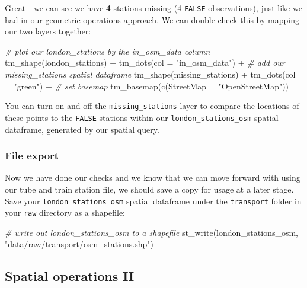 \documentclass[
]{book}
\newenvironment{Shaded}{\begin{snugshade}}{\end{snugshade}}
\newcommand{\AttributeTok}[1]{\textcolor[rgb]{0.77,0.63,0.00}{#1}}
\newcommand{\CommentTok}[1]{\textcolor[rgb]{0.56,0.35,0.01}{\textit{#1}}}
\newcommand{\FunctionTok}[1]{\textcolor[rgb]{0.00,0.00,0.00}{#1}}
\newcommand{\NormalTok}[1]{#1}
\newcommand{\SpecialCharTok}[1]{\textcolor[rgb]{0.00,0.00,0.00}{#1}}
\newcommand{\StringTok}[1]{\textcolor[rgb]{0.31,0.60,0.02}{#1}}
\begin{document}
Great - we can see we have \textbf{4} stations missing (4 \texttt{FALSE} observations), just like we had in our geometric operations approach. We can double-check this by mapping our two layers together:

\begin{Shaded}
\begin{Highlighting}[]
\CommentTok{\# plot our london\_stations by the in\_osm\_data column}
\FunctionTok{tm\_shape}\NormalTok{(london\_stations) }\SpecialCharTok{+} \FunctionTok{tm\_dots}\NormalTok{(}\AttributeTok{col =} \StringTok{"in\_osm\_data"}\NormalTok{) }\SpecialCharTok{+}
  \CommentTok{\# add our missing\_stations spatial dataframe}
  \FunctionTok{tm\_shape}\NormalTok{(missing\_stations) }\SpecialCharTok{+} \FunctionTok{tm\_dots}\NormalTok{(}\AttributeTok{col =} \StringTok{"green"}\NormalTok{) }\SpecialCharTok{+}
  \CommentTok{\# set basemap}
  \FunctionTok{tm\_basemap}\NormalTok{(}\FunctionTok{c}\NormalTok{(}\AttributeTok{StreetMap =} \StringTok{"OpenStreetMap"}\NormalTok{))}
\end{Highlighting}
\end{Shaded}

You can turn on and off the \texttt{missing\_stations} layer to compare the locations of these points to the \texttt{FALSE} stations within our \texttt{london\_stations\_osm} spatial dataframe, generated by our spatial query.

\hypertarget{file-export}{%
\subsubsection{File export}\label{file-export}}

Now we have done our checks and we know that we can move forward with using our tube and train station file, we should save a copy for usage at a later stage. Save your \texttt{london\_stations\_osm} spatial dataframe under the \texttt{transport} folder in your \texttt{raw} directory as a shapefile:

\begin{Shaded}
\begin{Highlighting}[]
\CommentTok{\# write out london\_stations\_osm to a shapefile}
\FunctionTok{st\_write}\NormalTok{(london\_stations\_osm, }\StringTok{"data/raw/transport/osm\_stations.shp"}\NormalTok{)}
\end{Highlighting}
\end{Shaded}

\hypertarget{spatial-operations-ii}{%
\subsection{Spatial operations II}\label{spatial-operations-ii}}
\end{document}
